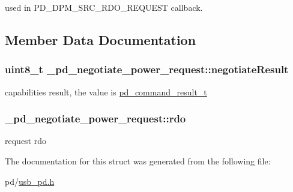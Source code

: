 used in P\-D\-\_\-\-D\-P\-M\-\_\-\-S\-R\-C\-\_\-\-R\-D\-O\-\_\-\-R\-E\-Q\-U\-E\-S\-T callback. 

\subsection{Member Data Documentation}
\hypertarget{struct__pd__negotiate__power__request_ac2aedb2edf9cb0038c459dface0494bf}{
\subsubsection[{negotiate\-Result}]{\setlength{\rightskip}{0pt plus 5cm}uint8\-\_\-t \-\_\-pd\-\_\-negotiate\-\_\-power\-\_\-request\-::negotiate\-Result}}\label{struct__pd__negotiate__power__request_ac2aedb2edf9cb0038c459dface0494bf}
capabilities result, the value is \hyperlink{group__usb__pd__stack_ga59917b1485caba4dd8d9b65ca5a5fd92}{pd\-\_\-command\-\_\-result\-\_\-t} \hypertarget{struct__pd__negotiate__power__request_a6a2c0c69d7a8506ef0334d0718a28191}{
\subsubsection[{rdo}]{ \-\_\-pd\-\_\-negotiate\-\_\-power\-\_\-request\-::rdo}}\label{struct__pd__negotiate__power__request_a6a2c0c69d7a8506ef0334d0718a28191}
request rdo 

The documentation for this struct was generated from the following file\-:\begin{DoxyCompactItemize}
\item 
pd/\hyperlink{usb__pd_8h}{usb\-\_\-pd.\-h}\end{DoxyCompactItemize}
